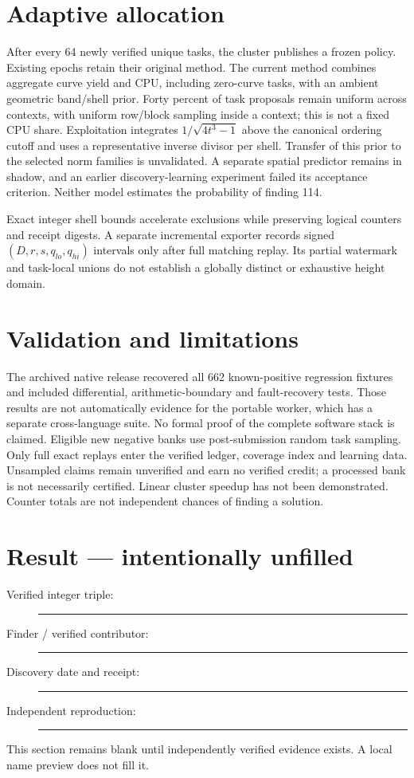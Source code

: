 \documentclass[11pt,a4paper]{article}
\begin{document}
\section{Adaptive allocation}
After every 64 newly verified unique tasks, the cluster publishes a frozen policy. Existing epochs retain their original method. The current method combines aggregate curve yield and CPU, including zero-curve tasks, with an ambient geometric band/shell prior. Forty percent of task proposals remain uniform across contexts, with uniform row/block sampling inside a context; this is not a fixed CPU share. Exploitation integrates $1/\sqrt{4t^3-1}$ above the canonical ordering cutoff and uses a representative inverse divisor per shell. Transfer of this prior to the selected norm families is unvalidated. A separate spatial predictor remains in shadow, and an earlier discovery-learning experiment failed its acceptance criterion. Neither model estimates the probability of finding 114.

Exact integer shell bounds accelerate exclusions while preserving logical counters and receipt digests. A separate incremental exporter records signed $(D,r,s,q_{lo},q_{hi})$ intervals only after full matching replay. Its partial watermark and task-local unions do not establish a globally distinct or exhaustive height domain.
\section{Validation and limitations}
The archived native release recovered all 662 known-positive regression fixtures and included differential, arithmetic-boundary and fault-recovery tests. Those results are not automatically evidence for the portable worker, which has a separate cross-language suite. No formal proof of the complete software stack is claimed. Eligible new negative banks use post-submission random task sampling. Only full exact replays enter the verified ledger, coverage index and learning data. Unsampled claims remain unverified and earn no verified credit; a processed bank is not necessarily certified. Linear cluster speedup has not been demonstrated. Counter totals are not independent chances of finding a solution.
\section{Result --- intentionally unfilled}
\begin{description}
\item[Verified integer triple:] \rule{85mm}{0.2pt}
\item[Finder / verified contributor:] \rule{70mm}{0.2pt}
\item[Discovery date and receipt:] \rule{70mm}{0.2pt}
\item[Independent reproduction:] \rule{70mm}{0.2pt}
\end{description}
This section remains blank until independently verified evidence exists. A local name preview does not fill it.
\end{document}
